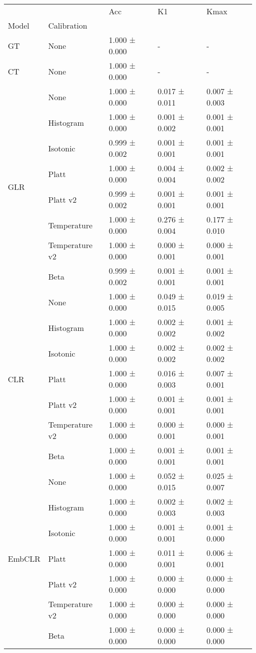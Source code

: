 \begin{tabular}{lllll}
\toprule
 &  & Acc & K1 & Kmax \\
Model & Calibration &  &  &  \\
\midrule
GT & None & 1.000 ± 0.000 & - & - \\
\cline{1-5}
CT & None & 1.000 ± 0.000 & - & - \\
\cline{1-5}
\multirow[t]{8}{*}{GLR} & None & 1.000 ± 0.000 & 0.017 ± 0.011 & 0.007 ± 0.003 \\
 & Histogram & 1.000 ± 0.000 & 0.001 ± 0.002 & 0.001 ± 0.001 \\
 & Isotonic & 0.999 ± 0.002 & 0.001 ± 0.001 & 0.001 ± 0.001 \\
 & Platt & 1.000 ± 0.000 & 0.004 ± 0.004 & 0.002 ± 0.002 \\
 & Platt v2 & 0.999 ± 0.002 & 0.001 ± 0.001 & 0.001 ± 0.001 \\
 & Temperature & 1.000 ± 0.000 & 0.276 ± 0.004 & 0.177 ± 0.010 \\
 & Temperature v2 & 1.000 ± 0.000 & 0.000 ± 0.001 & 0.000 ± 0.001 \\
 & Beta & 0.999 ± 0.002 & 0.001 ± 0.001 & 0.001 ± 0.001 \\
\cline{1-5}
\multirow[t]{7}{*}{CLR} & None & 1.000 ± 0.000 & 0.049 ± 0.015 & 0.019 ± 0.005 \\
 & Histogram & 1.000 ± 0.000 & 0.002 ± 0.002 & 0.001 ± 0.002 \\
 & Isotonic & 1.000 ± 0.000 & 0.002 ± 0.002 & 0.002 ± 0.002 \\
 & Platt & 1.000 ± 0.000 & 0.016 ± 0.003 & 0.007 ± 0.001 \\
 & Platt v2 & 1.000 ± 0.000 & 0.001 ± 0.001 & 0.001 ± 0.001 \\
 & Temperature v2 & 1.000 ± 0.000 & 0.000 ± 0.001 & 0.000 ± 0.001 \\
 & Beta & 1.000 ± 0.000 & 0.001 ± 0.001 & 0.001 ± 0.001 \\
\cline{1-5}
\multirow[t]{7}{*}{EmbCLR} & None & 1.000 ± 0.000 & 0.052 ± 0.015 & 0.025 ± 0.007 \\
 & Histogram & 1.000 ± 0.000 & 0.002 ± 0.003 & 0.002 ± 0.003 \\
 & Isotonic & 1.000 ± 0.000 & 0.001 ± 0.001 & 0.001 ± 0.000 \\
 & Platt & 1.000 ± 0.000 & 0.011 ± 0.001 & 0.006 ± 0.001 \\
 & Platt v2 & 1.000 ± 0.000 & 0.000 ± 0.000 & 0.000 ± 0.000 \\
 & Temperature v2 & 1.000 ± 0.000 & 0.000 ± 0.000 & 0.000 ± 0.000 \\
 & Beta & 1.000 ± 0.000 & 0.000 ± 0.000 & 0.000 ± 0.000 \\
\cline{1-5}
\bottomrule
\end{tabular}

